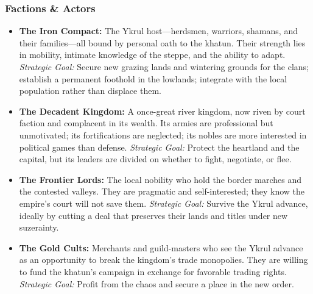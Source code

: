 \documentclass[11pt]{article}
\begin{document}
\subsubsection{Factions & Actors}
\begin{itemize}
\item \textbf{The Iron Compact:} The Ykrul host—herdsmen, warriors, shamans, and their families—all bound by personal oath to the khatun. Their strength lies in mobility, intimate knowledge of the steppe, and the ability to adapt. \textit{Strategic Goal:} Secure new grazing lands and wintering grounds for the clans; establish a permanent foothold in the lowlands; integrate with the local population rather than displace them.
\item \textbf{The Decadent Kingdom:} A once-great river kingdom, now riven by court faction and complacent in its wealth. Its armies are professional but unmotivated; its fortifications are neglected; its nobles are more interested in political games than defense. \textit{Strategic Goal:} Protect the heartland and the capital, but its leaders are divided on whether to fight, negotiate, or flee.
\item \textbf{The Frontier Lords:} The local nobility who hold the border marches and the contested valleys. They are pragmatic and self-interested; they know the empire's court will not save them. \textit{Strategic Goal:} Survive the Ykrul advance, ideally by cutting a deal that preserves their lands and titles under new suzerainty.
\item \textbf{The Gold Cults:} Merchants and guild-masters who see the Ykrul advance as an opportunity to break the kingdom's trade monopolies. They are willing to fund the khatun's campaign in exchange for favorable trading rights. \textit{Strategic Goal:} Profit from the chaos and secure a place in the new order.
\end{itemize}
\end{document}
